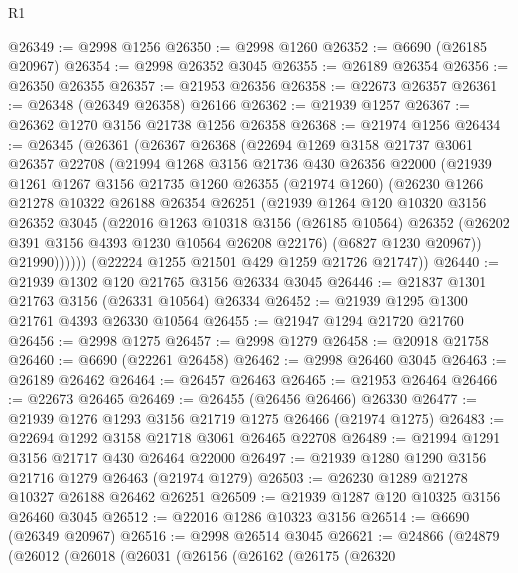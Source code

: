 \begin{lexlean}{R1}
\begin{coremodule}
@26349 := @2998 @1256
@26350 := @2998 @1260
@26352 := @6690 (@26185 @20967)
@26354 := @2998 @26352 @3045
@26355 := @26189 @26354
@26356 := @26350 @26355
@26357 := @21953 @26356
@26358 := @22673 @26357
@26361 := @26348 (@26349 @26358) @26166
@26362 := @21939 @1257
@26367 := @26362 @1270 @3156 @21738 @1256 @26358
@26368 := @21974 @1256
@26434 := @26345
    (@26361
      (@26367
        @26368
        (@22694
          @1269
          @3158
          @21737
          @3061
          @26357
          @22708
          (@21994
            @1268
            @3156
            @21736
            @430
            @26356
            @22000
            (@21939
              @1261
              @1267
              @3156
              @21735
              @1260
              @26355
              (@21974 @1260)
              (@26230
                @1266
                @21278
                @10322
                @26188
                @26354
                @26251
                (@21939
                  @1264
                  @120
                  @10320
                  @3156
                  @26352
                  @3045
                  (@22016
                    @1263
                    @10318
                    @3156
                    (@26185 @10564)
                    @26352
                    (@26202 @391 @3156 @4393 @1230 @10564 @26208 @22176)
                    (@6827 @1230 @20967))
                  @21990))))))
      (@22224 @1255 @21501 @429 @1259 @21726 @21747))
@26440 := @21939 @1302 @120 @21765 @3156 @26334 @3045
@26446 := @21837 @1301 @21763 @3156 (@26331 @10564) @26334
@26452 := @21939 @1295 @1300 @21761 @4393 @26330 @10564
@26455 := @21947 @1294 @21720 @21760
@26456 := @2998 @1275
@26457 := @2998 @1279
@26458 := @20918 @21758
@26460 := @6690 (@22261 @26458)
@26462 := @2998 @26460 @3045
@26463 := @26189 @26462
@26464 := @26457 @26463
@26465 := @21953 @26464
@26466 := @22673 @26465
@26469 := @26455 (@26456 @26466) @26330
@26477 := @21939 @1276 @1293 @3156 @21719 @1275 @26466 (@21974 @1275)
@26483 := @22694 @1292 @3158 @21718 @3061 @26465 @22708
@26489 := @21994 @1291 @3156 @21717 @430 @26464 @22000
@26497 := @21939 @1280 @1290 @3156 @21716 @1279 @26463 (@21974 @1279)
@26503 := @26230 @1289 @21278 @10327 @26188 @26462 @26251
@26509 := @21939 @1287 @120 @10325 @3156 @26460 @3045
@26512 := @22016 @1286 @10323 @3156
@26514 := @6690 (@26349 @20967)
@26516 := @2998 @26514 @3045
@26621 := @24866
    (@24879
      (@26012
        (@26018
          (@26031
            (@26156
              (@26162
                (@26175
                  (@26320

\end{coremodule}
\end{lexlean}
